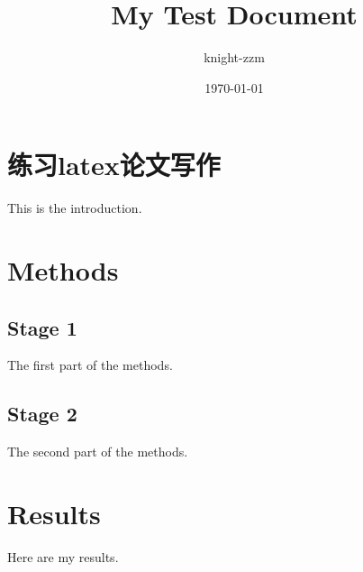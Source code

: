 \documentclass[a4paper,12pt]{report}
\begin{document}
\title{My Test Document}
\author{knight-zzm}
\date{\today}
\maketitle

\section{练习latex论文写作}
This is the introduction.

\section{Methods}

\subsection{Stage 1}
The first part of the methods.

\subsection{Stage 2}
The second part of the methods.

\section{Results}
Here are my results.
\end{document}
